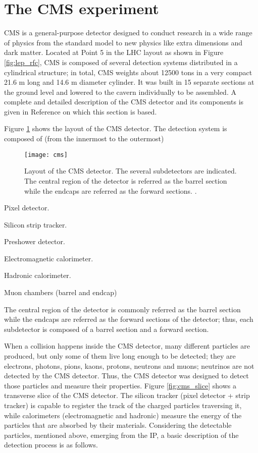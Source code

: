 \section{The CMS experiment}

CMS is a general-purpose detector designed to conduct research in a wide range of physics from the standard model to new physics like extra dimensions and dark matter. Located at Point 5 in the LHC layout as shown in Figure \ref{fig:lep_rfc}, CMS is composed of several detection systems distributed in a cylindrical structure; in total, CMS weights about 12500 tons in a very compact 21.6 m long and 14.6 m diameter cylinder. It was built in 15 separate sections at the ground level and lowered to the cavern individually to be assembled. A complete and detailed description of the CMS detector and its components is given in Reference \cite{cms} on which this section is based.

\noindent Figure \ref{fig:cms} shows the layout of the CMS detector. The detection system is composed of (from the innermost to the outermost)

\begin{figure}[!h]
  \centering
  \texttt{[image: cms]}
  \caption[Layout of the CMS detector]{Layout of the CMS detector. The several subdetectors are indicated. The central region of the detector is referred as the barrel section while the endcaps are referred as the forward sections. \cite{cms_drawing}.}
  \label{fig:cms}
\end{figure}

\bit
\item Pixel detector.
\item Silicon strip tracker.
\item Preshower detector.
\item Electromagnetic calorimeter.
\item Hadronic calorimeter.
\item Muon chambers (barrel and endcap)
\eit

The central region of the detector is commonly referred as the barrel section while the endcaps are referred as the forward sections of the detector; thus, each subdetector is composed of a barrel section and a forward section. 

When a \pp collision happens inside the CMS detector, many different particles are produced, but only some of them live long enough to be detected; they are electrons, photons, pions, kaons, protons, neutrons and muons; neutrinos are not detected by the CMS detector. Thus, the CMS detector was designed to detect those particles and measure their properties. Figure \ref{fig:cms_slice} shows a transverse slice of the CMS detector. The silicon tracker (pixel detector + strip tracker) is capable to register the track of the charged particles traversing it, while calorimeters (electromagnetic and hadronic) measure the energy of the particles that are absorbed by their materials. Considering the detectable particles, mentioned above, emerging from the IP, a basic description of the detection process is as follows. 

